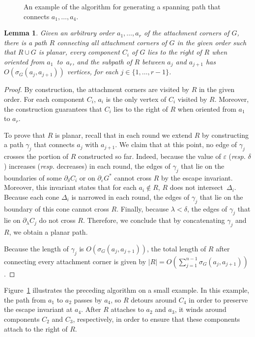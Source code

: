 \documentclass{patmorin}
\newtheorem{lemma}[theorem]{Lemma}
\begin{document}
\begin{figure}
   \caption{An example of the algorithm for generating a spanning path that connects $a_1,\ldots,a_4$.}
   \label{figure:big-example}
\end{figure}

\begin{lemma}\label{lemma:Path for connected augmentations}
Given an arbitrary order $a_1, \ldots, a_r$ of the attachment corners of $G$, there is a path $R$ connecting all attachment corners of $G$ in the given order such that $R\cup G$ is planar, every component $C_i$ of $G$ lies to the right of $R$ when oriented from $a_1$~to~$a_r$, and the subpath of $R$ between $a_j$ and $a_{j+1}$ has $O(\sigma_G(a_j, a_{j+1}))$ vertices, for each $j\in \{1,\dots,r-1\}$.
\end{lemma}
\begin{proof}
By construction, the attachment corners are visited by $R$ in the given order. For each component $C_i$, $a_i$ is the only vertex of $C_i$ visited by $R$. Moreover, the construction guarantees that $C_i$ lies to the right of $R$ when oriented from $a_1$ to $a_r$.

To prove that $R$ is planar, recall that in each round we extend $R$ by constructing  a path $\gamma_j$ that connects $a_j$ with $a_{j+1}$. We claim that at this point, no edge of $\gamma_j$ crosses the portion of $R$ constructed so far.
Indeed, because the value of $\varepsilon$ (\emph{resp.} $\delta$) increases (\emph{resp.} decreases) in each round, the edges of $\gamma_j$ that lie on the boundaries of some $\partial_\delta C_i$ or on $\partial_\varepsilon G^*$ cannot cross $R$ by the escape invariant.
Moreover, this invariant states that for each $a_i\notin R$, $R$ does not intersect~$\Delta_i$.
Because each cone $\Delta_i$ is narrowed in each round, the edges of $\gamma_j$ that lie on the boundary of this cone cannot cross $R$. Finally, because $\lambda < \delta$, the edges of $\gamma_j$ that lie on $\partial_\lambda C_j$ do not cross $R$. Therefore, we conclude that by concatenating $\gamma_j$ and $R$, we obtain a planar path.

Because the length of $\gamma_j$ is $O(\sigma_G(a_j, a_{j+1}))$, the total length of $R$ after connecting every attachment corner is given by $|R| = O(\sum_{j=1}^{n-1} \sigma_G(a_j, a_{j+1}))$.
\end{proof}

Figure~\ref{figure:big-example} illustrates the preceding algorithm on a small example.  In this example, the path from $a_1$ to $a_2$ passes by $a_4$, so $R$ detours around $C_4$ in order to preserve the escape invariant at $a_4$.  After $R$ attaches to $a_2$ and $a_3$, it winds around components $C_2$ and $C_3$, respectively, in order to ensure that these components attach to the right of $R$.
\end{document}
